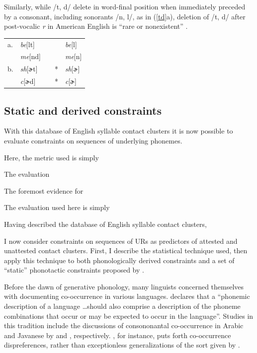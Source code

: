 Similarly, while /t, d/ delete in word-final position when immediately preceded by a consonant, including sonorants /n, l/, as in (\ref{td}a), deletion of /t, d/ after post-vocalic \emph{r} in American English is ``rare or nonexistent'' \citep[][8]{Guy1980}. 

\begin{example} \label{td}
\begin{tabular}{l l l l@{} l}
a. & \emph{be}[lt] & \alt{} &   & \emph{be}[l] \\
   & \emph{me}[nd] & \alt{} &   & \emph{me}[n] \\
b. & \emph{sh}[ɚt] & \alt{} & * & \emph{sh}[ɚ] \\
   & \emph{c}[ɚd]  & \alt{} & * & \emph{c}[ɚ]  \\
\end{tabular}
\end{example}

\subsection{Static and derived constraints}

With this database of English syllable contact clusters it is now possible to evaluate constraints on sequences of underlying phonemes. 

Here, the metric used is simply 

The evaluation 

The foremost evidence for 


The evaluation used here is simply 

Having described the database of English syllable contact clusters, 



I now consider constraints on sequences of URs as predictors of attested and unattested contact clusters. First, I describe the statistical technique used, then apply this technique to both phonologically derived constraints and a set of ``static'' phonotactic constraints proposed by \citet{Pierrehumbert1994}. 

Before the dawn of generative phonology, many linguists concerned themselves with documenting co-occurrence in various languages. \citet[][28]{Vogt1954} declares that a ``phonemic description of a language \ldots should also comprise a description of the phoneme combinations that occur or may be expected to occur in the language''. Studies in this tradition include the discussions of consononantal co-occurrence in Arabic and Javanese by \citet{Greenberg1950} and \citet{Uhlenbeck1950}, respectively. \citeauthor{Uhlenbeck1950}, for instance, puts forth co-occurrence dispreferences, rather than exceptionless generalizations of the sort given by \citet{Greenberg1950}. 

